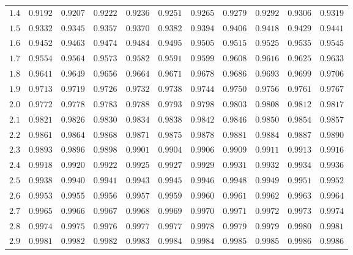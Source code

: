 \documentclass[
  11pt,
  a4paper,
  krantz2]{krantz}
\begin{document}
\begin{table}
\begin{tabular}{lrrrrrrrrrr}
$ 1.4 $ & $0.9192$ & $0.9207$ & $0.9222$ & $0.9236$ & $0.9251$ & $0.9265$ & $0.9279$ & $0.9292$ & $0.9306$ & $0.9319$\\
\vspace{3pt}
$ 1.5 $ & $0.9332$ & $0.9345$ & $0.9357$ & $0.9370$ & $0.9382$ & $0.9394$ & $0.9406$ & $0.9418$ & $0.9429$ & $0.9441$\\
$ 1.6 $ & $0.9452$ & $0.9463$ & $0.9474$ & $0.9484$ & $0.9495$ & $0.9505$ & $0.9515$ & $0.9525$ & $0.9535$ & $0.9545$\\
$ 1.7 $ & $0.9554$ & $0.9564$ & $0.9573$ & $0.9582$ & $0.9591$ & $0.9599$ & $0.9608$ & $0.9616$ & $0.9625$ & $0.9633$\\
$ 1.8 $ & $0.9641$ & $0.9649$ & $0.9656$ & $0.9664$ & $0.9671$ & $0.9678$ & $0.9686$ & $0.9693$ & $0.9699$ & $0.9706$\\
$ 1.9 $ & $0.9713$ & $0.9719$ & $0.9726$ & $0.9732$ & $0.9738$ & $0.9744$ & $0.9750$ & $0.9756$ & $0.9761$ & $0.9767$\\
\vspace{3pt}
$ 2.0 $ & $0.9772$ & $0.9778$ & $0.9783$ & $0.9788$ & $0.9793$ & $0.9798$ & $0.9803$ & $0.9808$ & $0.9812$ & $0.9817$\\
$ 2.1 $ & $0.9821$ & $0.9826$ & $0.9830$ & $0.9834$ & $0.9838$ & $0.9842$ & $0.9846$ & $0.9850$ & $0.9854$ & $0.9857$\\
$ 2.2 $ & $0.9861$ & $0.9864$ & $0.9868$ & $0.9871$ & $0.9875$ & $0.9878$ & $0.9881$ & $0.9884$ & $0.9887$ & $0.9890$\\
$ 2.3 $ & $0.9893$ & $0.9896$ & $0.9898$ & $0.9901$ & $0.9904$ & $0.9906$ & $0.9909$ & $0.9911$ & $0.9913$ & $0.9916$\\
$ 2.4 $ & $0.9918$ & $0.9920$ & $0.9922$ & $0.9925$ & $0.9927$ & $0.9929$ & $0.9931$ & $0.9932$ & $0.9934$ & $0.9936$\\
\vspace{3pt}
$ 2.5 $ & $0.9938$ & $0.9940$ & $0.9941$ & $0.9943$ & $0.9945$ & $0.9946$ & $0.9948$ & $0.9949$ & $0.9951$ & $0.9952$\\
$ 2.6 $ & $0.9953$ & $0.9955$ & $0.9956$ & $0.9957$ & $0.9959$ & $0.9960$ & $0.9961$ & $0.9962$ & $0.9963$ & $0.9964$\\
$ 2.7 $ & $0.9965$ & $0.9966$ & $0.9967$ & $0.9968$ & $0.9969$ & $0.9970$ & $0.9971$ & $0.9972$ & $0.9973$ & $0.9974$\\
$ 2.8 $ & $0.9974$ & $0.9975$ & $0.9976$ & $0.9977$ & $0.9977$ & $0.9978$ & $0.9979$ & $0.9979$ & $0.9980$ & $0.9981$\\
$ 2.9 $ & $0.9981$ & $0.9982$ & $0.9982$ & $0.9983$ & $0.9984$ & $0.9984$ & $0.9985$ & $0.9985$ & $0.9986$ & $0.9986$\\

\end{tabular}
\end{table}
\end{document}
